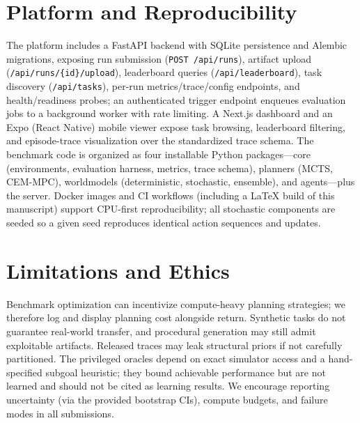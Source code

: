 \documentclass[11pt]{article}
\begin{document}
\section{Platform and Reproducibility}
The platform includes a FastAPI backend with SQLite persistence and Alembic migrations, exposing run submission (\texttt{POST /api/runs}), artifact upload (\texttt{/api/runs/\{id\}/upload}), leaderboard queries (\texttt{/api/leaderboard}), task discovery (\texttt{/api/tasks}), per-run metrics/trace/config endpoints, and health/readiness probes; an authenticated trigger endpoint enqueues evaluation jobs to a background worker with rate limiting. A Next.js dashboard and an Expo (React Native) mobile viewer expose task browsing, leaderboard filtering, and episode-trace visualization over the standardized trace schema. The benchmark code is organized as four installable Python packages---core (environments, evaluation harness, metrics, trace schema), planners (MCTS, CEM-MPC), worldmodels (deterministic, stochastic, ensemble), and agents---plus the server. Docker images and CI workflows (including a LaTeX build of this manuscript) support CPU-first reproducibility; all stochastic components are seeded so a given seed reproduces identical action sequences and updates.

\section{Limitations and Ethics}
Benchmark optimization can incentivize compute-heavy planning strategies; we therefore log and display planning cost alongside return. Synthetic tasks do not guarantee real-world transfer, and procedural generation may still admit exploitable artifacts. Released traces may leak structural priors if not carefully partitioned. The privileged oracles depend on exact simulator access and a hand-specified subgoal heuristic; they bound achievable performance but are not learned and should not be cited as learning results. We encourage reporting uncertainty (via the provided bootstrap CIs), compute budgets, and failure modes in all submissions.



\end{document}

